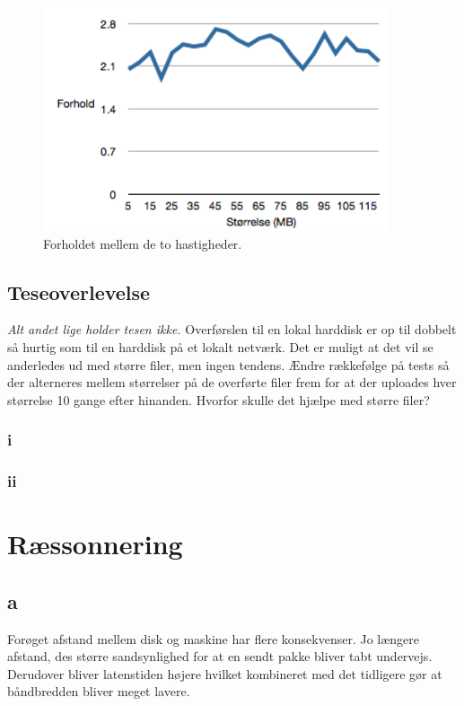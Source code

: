 \documentclass{article}
\begin{document}
\begin{figure}
	\includegraphics[width=4in]{plotforhold.png}
	\caption{Forholdet mellem de to hastigheder.}
	\label{plotforhold}
\end{figure}

\subsection{Teseoverlevelse}

\textit{Alt andet lige holder tesen ikke.}
Overførslen til en lokal harddisk er op til dobbelt så hurtig som til en harddisk på et lokalt netværk.
Det er muligt at det vil se anderledes ud med større filer, men ingen tendens.
Ændre rækkefølge på tests så der alterneres mellem størrelser på de overførte filer frem for at der uploades hver størrelse 10 gange efter hinanden.
Hvorfor skulle det hjælpe med større filer?

\subsubsection{i}

\subsubsection{ii}

\section{Ræssonnering}

\subsection{a}
Forøget afstand mellem disk og maskine har flere konsekvenser. Jo længere afstand, des større sandsynlighed for at en sendt pakke bliver tabt undervejs. Derudover bliver latenstiden højere hvilket kombineret med det tidligere gør at båndbredden bliver meget lavere.
\end{document}

